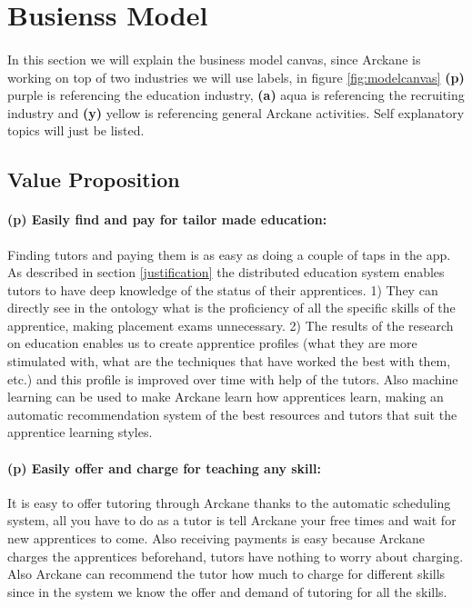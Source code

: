\section{Busienss Model}\label{business_model}

\paragraph{} In this section we will explain the business model canvas, since Arckane is working on top of two industries we will use labels, in figure \ref{fig:modelcanvas} \textbf{(p)} purple is referencing the education industry, \textbf{(a)} aqua is referencing the recruiting industry and \textbf{(y)} yellow is referencing general Arckane activities. Self explanatory topics will just be listed.


\subsection{Value Proposition}\label{valueproposition}

\paragraph{(p) Easily find and pay for tailor made education:} Finding tutors and paying them is as easy as doing a couple of taps in the app. As described in section \ref{justification} the distributed education system enables tutors to have deep knowledge of the status of their apprentices. 1) They can directly see in the ontology what is the proficiency of all the specific skills of the apprentice, making placement exams unnecessary. 2) The results of the research on education enables us to create apprentice profiles (what they are more stimulated with, what are the techniques that have worked the best with them, etc.) and this profile is improved over time with help of the tutors. Also machine learning can be used to make Arckane learn how apprentices learn, making an automatic recommendation system of the best resources and tutors that suit the apprentice learning styles. 

\paragraph{(p) Easily offer and charge for teaching any skill:} It is easy to offer tutoring through Arckane thanks to the automatic scheduling system, all you have to do as a tutor is tell Arckane your free times and wait for new apprentices to come. Also receiving payments is easy because Arckane charges the apprentices beforehand, tutors have nothing to worry about charging. Also Arckane can recommend the tutor how much to charge for different skills since in the system we know the offer and demand of tutoring for all the skills.

